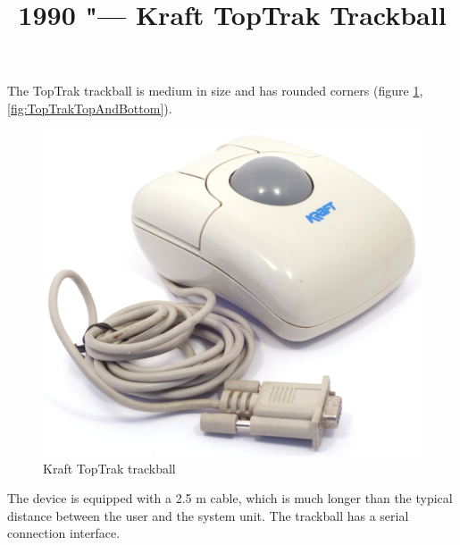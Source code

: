\documentclass[11pt, a4paper]{article}
\begin{document}
\title{1990 "--- Kraft TopTrak Trackball}
\date{}
\maketitle
{}
The TopTrak trackball is medium in size and has rounded corners (figure \ref{fig:TopTrakPic}, \ref{fig:TopTrakTopAndBottom}).

\begin{figure}[h]
    \centering
    \includegraphics[scale=0.45]{1990_kraft_toptrack/pic_60.jpg}
    \caption{Kraft TopTrak trackball}
    \label{fig:TopTrakPic}
\end{figure}

The device is equipped with a 2.5 m cable, which is much longer than the typical distance between the user and the system unit. The trackball has a serial connection interface.
\end{document}
